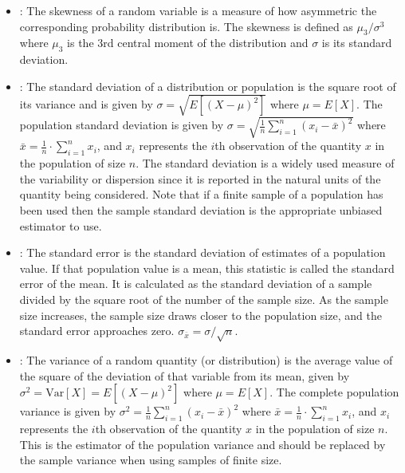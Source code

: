 \documentclass[draftspec]{sbmlpkgspec}
\begin{document}
\begin{itemize}
\item {}:  The skewness of a random variable is a measure of how asymmetric the corresponding probability distribution is. The skewness is defined as $ \mu_3/\sigma^3 $ where $ \mu_3 $ is the 3rd central moment of the distribution and $ \sigma $ is its standard deviation.

\item {}:  The standard deviation of a distribution or population is the square root of its variance and is given by $ \sigma = \sqrt{E[(X - \mu)^2]} $ where $ \mu = E[X] $. The population standard deviation is given by $ \sigma = \sqrt{\frac{1}{n} \sum_{i=1}^n\left(x_i - \bar{x} \right)^2} $ where $ \bar{x} = \frac{1}{n}\cdot \sum_{i=1}^n{x_i} $, and $ x_i $ represents the $ i $th observation of the quantity $ x $ in the population of size $ n $. The standard deviation is a widely used measure of the variability or dispersion since it is reported in the natural units of the quantity being considered. Note that if a finite sample of a population has been used then the sample standard deviation is the appropriate unbiased estimator to use.

\item {}:  The standard error is the standard deviation of estimates of a population value. If that population value is a mean, this statistic is called the standard error of the mean.  It is calculated as the standard deviation of a sample divided by the square root of the number of the sample size.  As the sample size increases, the sample size draws closer to the population size, and the standard error approaches zero.  $ \sigma_{\bar{x}} = \sigma/\sqrt{n} $.

\item {}:  The variance of a random quantity (or distribution) is the average value of the square of the deviation of that variable from its mean, given by $ \sigma^2 = \text{Var}[X] = E[(X - \mu)^2] $ where $ \mu = E[X] $. The complete population variance is given by $ \sigma^2 = \frac{1}{n} \sum_{i=1}^n\left(x_i - \bar{x} \right)^2 $ where $ \bar{x} = \frac{1}{n}\cdot \sum_{i=1}^n{x_i} $, and $ x_i $ represents the $ i $th observation of the quantity $ x $ in the population of size $ n $. This is the estimator of the population variance and should be replaced by the sample variance when using samples of finite size.

\end{itemize}
\end{document}
